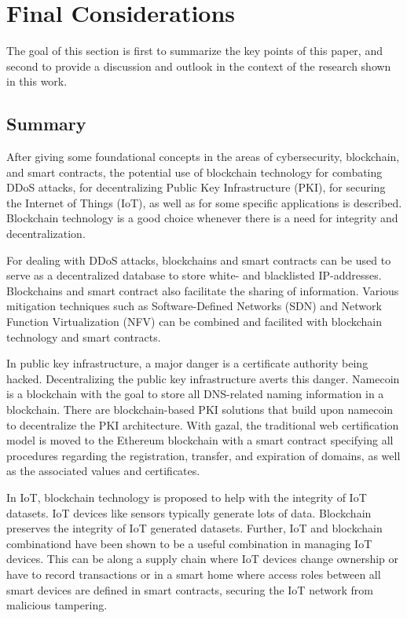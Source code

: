 \section{Final Considerations}

The goal of this section is first to summarize the key points of this paper, and second to provide a discussion and outlook in the context of the research shown in this work.

\subsection{Summary}

After giving some foundational concepts in the areas of cybersecurity, blockchain, and smart contracts, the potential use of blockchain technology for combating DDoS attacks, for decentralizing Public Key Infrastructure (PKI), for securing the Internet of Things (IoT), as well as for some specific applications is described. Blockchain technology is a good choice whenever there is a need for integrity and decentralization.

For dealing with DDoS attacks, blockchains and smart contracts can be used to serve as a decentralized database to store white- and blacklisted IP-addresses. Blockchains and smart contract also facilitate the sharing of information.
Various mitigation techniques such as Software-Defined Networks (SDN) and Network Function Virtualization (NFV) can be combined and facilited with blockchain technology and smart contracts.

In public key infrastructure, a major danger is a certificate authority being hacked. Decentralizing the public key infrastructure averts this danger. Namecoin is a blockchain with the goal to store all DNS-related naming information in a blockchain. There are blockchain-based PKI solutions that build upon namecoin to decentralize the PKI architecture.
With gazal, the traditional web certification model is moved to the Ethereum blockchain with a smart contract specifying all procedures regarding the registration, transfer, and expiration of domains, as well as the associated values and certificates.

In IoT, blockchain technology is proposed to help with the integrity of IoT datasets. IoT devices like sensors typically generate lots of data. Blockchain preserves the integrity of IoT generated datasets. Further, IoT and blockchain combinationd have been shown to be a useful
combination in managing IoT devices. This can be along a supply chain where IoT devices change ownership or have to record transactions or in a smart home
where access roles between all smart devices are defined in smart contracts, securing the IoT network from malicious tampering.

